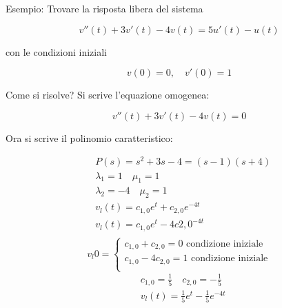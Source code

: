 \documentclass[a4paper, 12pt]{book}
\theoremstyle{plain}
\begin{document}
Esempio: Trovare la risposta libera del sistema

\[
    v''(t) + 3v'(t) - 4v(t) = 5u'(t) - u(t)
\]

con le condizioni iniziali

\[
    v(0) = 0, \quad v'(0) = 1
\]

Come si risolve? Si scrive l'equazione omogenea:

\[
    v''(t) + 3v'(t) - 4v(t) = 0
\]

Ora si scrive il polinomio caratteristico:

\[
    \begin{split}
        &P(s) = s^2 + 3s - 4 = (s - 1)(s + 4) \\
        &\lambda_1 = 1 \quad \mu_1 = 1 \\
        &\lambda_2 = -4 \quad \mu_2 = 1 \\
        &v_l(t) = c_{1,0} e^t + c_{2,0} e^{-4t} \\
        &v_l(t) = c_{1,0} e^t - 4c{2,0}^{-4t} \\
    \end{split}
\]
\[
v_l{0} =
    \begin{cases}
        c_{1,0} + c_{2,0} = 0 \textrm{ condizione iniziale} \\
        c_{1,0} - 4c_{2,0} = 1 \textrm{ condizione iniziale} \\
    \end{cases}
\]
\[
    \begin{split}
        &c_{1,0} = \frac{1}{5} \quad c_{2,0} = -\frac{1}{5} \\
        &v_l(t) = \frac{1}{5} e^t - \frac{1}{5} e^{-4t}
    \end{split}
\]

    
\end{document}
